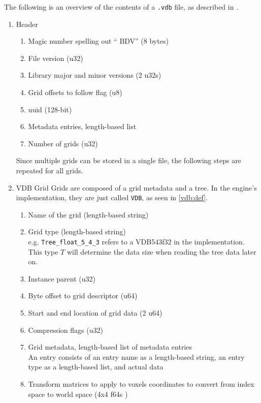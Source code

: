 The following is an overview of the contents of a \verb|.vdb| file, as described in \cite{vdbfile}.


\begin{enumerate}
  \item Header
        \begin{enumerate}
          \item Magic number spelling out `` BDV'' (8 bytes)
          \item File version (u32)
          \item Library major and minor versions (2 u32s)
          \item Grid offsets to follow flag (u8)
          \item \acrshort{uuid} (128-bit)
          \item Metadata entries, length-based list
          \item Number of grids (u32)
        \end{enumerate}
        Since multiple grids can be stored in a single file, the following steps are repeated for all grids.
  \item VDB Grid
        Grids are composed of a grid metadata and a tree. In the engine's implementation, they are just called \verb|VDB|, as seen in \cref{vdb:def}.
        \begin{enumerate}
          \item Name of the grid (length-based string)
          \item Grid type (length-based string) \\
                e.g. \verb|Tree_float_5_4_3| refers to a VDB543\<f32\> in the implementation.
                This type $T$ will determine the data size when reading the tree data later on.
          \item Instance parent (u32)
          \item Byte offset to grid descriptor (u64)
          \item Start and end location of grid data (2 u64)
          \item Compression flags (u32)
          \item\label{file:meta} Grid metadata, length-based list of metadata entries \\
                An entry consists of an entry name as a length-based string, an entry type as a length-based list, and actual data
          \item Transform matrices to apply to voxels coordinates to convert from index space to world space (4x4 f64s )

\end{enumerate}
\end{enumerate}
